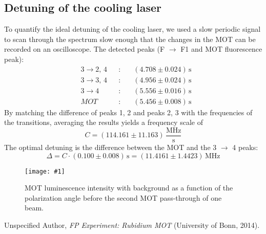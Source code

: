 \documentclass[twocolumn]{article}
\newcommand{\insertFigure}[1]{%
   \texttt{[image: \#1]}%
}
\begin{document}
\subsection{Detuning of the cooling laser}
To quantify the ideal detuning of the cooling laser, we used a slow periodic signal to scan through the spectrum slow enough that the changes in the MOT can be recorded on an oscilloscope. The detected peaks (F $\rightarrow$ F1 and MOT fluorescence peak):
\begin{alignat*}{3}
&3 \rightarrow 2, \, 4&&: \hspace{12pt} &(4.708 \pm 0.024) \, \text{s}\\
&3 \rightarrow 3, \, 4&&:  &(4.956 \pm 0.024) \, \text{s}\\
&3 \rightarrow 4&&:		 &(5.556 \pm 0.016)\, \text{s}\\
&MOT			&&:		&(5.456 \pm 0.008) \, \text{s}
\end{alignat*}
By matching the difference of peaks 1, 2 and peaks 2, 3 with the frequencies of the transitions, averaging the results yields a frequency scale of
\begin{equation}
C =(114.161 \pm 11.163)\, \frac{\text{MHz}}{\text{s}} \nonumber
\end{equation}
The optimal detuning is the difference between the MOT and the 3 $\rightarrow$ 4 peaks:
\begin{equation}
\Delta = C \cdot (0.100 \pm 0.008) \, \text{s} = (11.4161 \pm 1.4423) \, \text{MHz} \nonumber
\end{equation}
\begin{figure}
\centering
\insertFigure{Images/Detuning_cooling.png}
\caption{MOT luminescence intensity with background as a function of the polarization angle before the second MOT pass-through of one beam.}
\label{fig:Detuning}
\end{figure}


\begin{thebibliography}{9}
Unspecified Author, \textsl{FP Experiment: Rubidium MOT} (University of Bonn, 2014).
\end{thebibliography}
\end{document}
